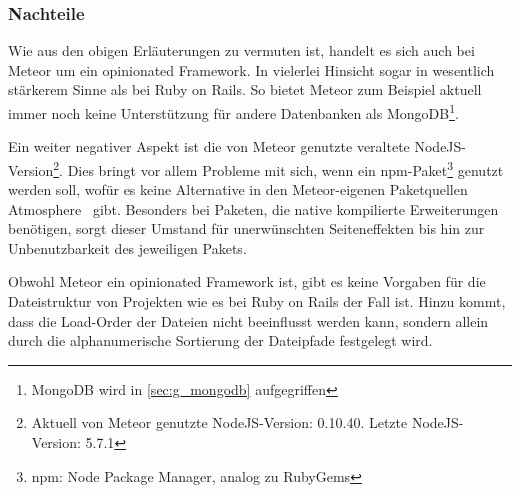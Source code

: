 \subsubsection{Nachteile}
\label{sssec:elm_nachteile}

Wie aus den obigen Erläuterungen zu vermuten ist, handelt es sich auch bei
Meteor um ein opinionated Framework.  In vielerlei Hinsicht sogar in wesentlich
stärkerem Sinne als bei Ruby on Rails.  So bietet Meteor zum Beispiel aktuell
immer noch keine Unterstützung für andere Datenbanken als
MongoDB\footnote{MongoDB wird in \cref{sec:g_mongodb} aufgegriffen}.

Ein weiter negativer Aspekt ist die von Meteor genutzte veraltete
NodeJS-Version\footnote{Aktuell von Meteor genutzte NodeJS-Version: 0.10.40.
Letzte NodeJS-Version: 5.7.1}.  Dies bringt vor allem Probleme mit sich, wenn
ein npm-Paket\footnote{npm: Node Package Manager, analog zu RubyGems} genutzt
werden soll, wofür es keine Alternative in den Meteor-eigenen Paketquellen
Atmosphere~\cite{atmospherejs} gibt.  Besonders bei Paketen, die native
kompilierte Erweiterungen benötigen, sorgt dieser Umstand für unerwünschten
Seiteneffekten bis hin zur Unbenutzbarkeit des jeweiligen Pakets.

Obwohl Meteor ein opinionated Framework ist, gibt es keine Vorgaben für die
Dateistruktur von Projekten wie es bei Ruby on Rails der Fall ist.  Hinzu kommt,
dass die Load-Order der Dateien nicht beeinflusst werden kann, sondern allein
durch die alphanumerische Sortierung der Dateipfade festgelegt wird.
